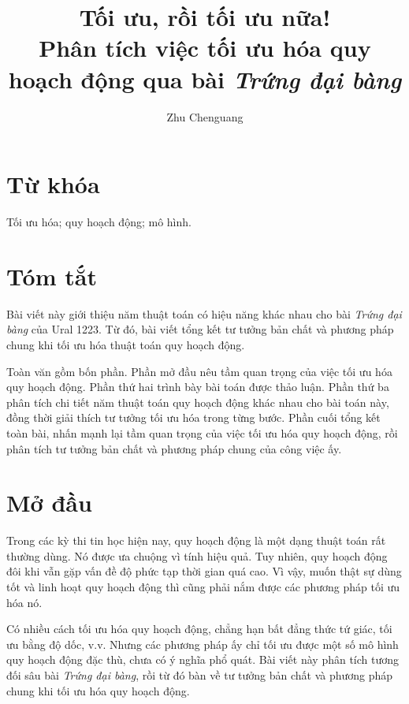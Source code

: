 \documentclass[11pt]{article}
\title{Tối ưu, rồi tối ưu nữa!\\
\large Phân tích việc tối ưu hóa quy hoạch động qua bài \emph{Trứng đại bàng}}
\author{Zhu Chenguang}
\date{}
\begin{document}
\maketitle


\section*{Từ khóa}

Tối ưu hóa; quy hoạch động; mô hình.

\section*{Tóm tắt}

Bài viết này giới thiệu năm thuật toán có hiệu năng khác nhau cho bài
\emph{Trứng đại bàng} của Ural 1223. Từ đó, bài viết tổng kết tư tưởng bản
chất và phương pháp chung khi tối ưu hóa thuật toán quy hoạch động.

Toàn văn gồm bốn phần. Phần mở đầu nêu tầm quan trọng của việc tối ưu hóa quy
hoạch động. Phần thứ hai trình bày bài toán được thảo luận. Phần thứ ba phân
tích chi tiết năm thuật toán quy hoạch động khác nhau cho bài toán này, đồng
thời giải thích tư tưởng tối ưu hóa trong từng bước. Phần cuối tổng kết toàn
bài, nhấn mạnh lại tầm quan trọng của việc tối ưu hóa quy hoạch động, rồi
phân tích tư tưởng bản chất và phương pháp chung của công việc ấy.

\section{Mở đầu}

Trong các kỳ thi tin học hiện nay, quy hoạch động là một dạng thuật toán rất
thường dùng. Nó được ưa chuộng vì tính hiệu quả. Tuy nhiên, quy hoạch động đôi
khi vẫn gặp vấn đề độ phức tạp thời gian quá cao. Vì vậy, muốn thật sự dùng
tốt và linh hoạt quy hoạch động thì cũng phải nắm được các phương pháp tối ưu
hóa nó.

Có nhiều cách tối ưu hóa quy hoạch động, chẳng hạn bất đẳng thức tứ giác,
tối ưu bằng độ dốc, v.v. Nhưng các phương pháp ấy chỉ tối ưu được một số mô
hình quy hoạch động đặc thù, chưa có ý nghĩa phổ quát. Bài viết này phân tích
tương đối sâu bài \emph{Trứng đại bàng}, rồi từ đó bàn về tư tưởng bản chất và
phương pháp chung khi tối ưu hóa quy hoạch động.
\end{document}
